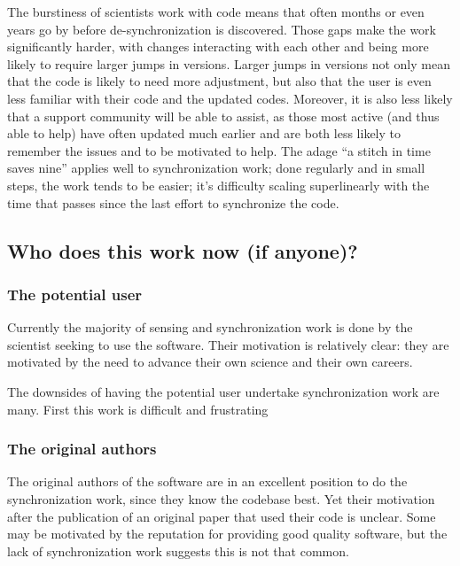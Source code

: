 \documentclass{sigchi}
\begin{document}
The burstiness of scientists work with code means that often months or even years go by before de-synchronization is discovered. Those gaps make the work significantly harder, with changes interacting with each other and being more likely to require larger jumps in versions. Larger jumps in versions not only mean that the code is likely to need more adjustment, but also that the user is even less familiar with their code and the updated codes. Moreover, it is also less likely that a support community will be able to assist, as those most active (and thus able to help) have often updated much earlier and are both less likely to remember the issues and to be motivated to help. The adage ``a stitch in time saves nine'' applies well to synchronization work; done regularly and in small steps, the work tends to be easier; it's difficulty scaling superlinearly with the time that passes since the last effort to synchronize the code.

\subsection{Who does this work now (if anyone)?}



\subsubsection{The potential user}

Currently the majority of sensing and synchronization work is done by the scientist seeking to use the software. Their motivation is relatively clear: they are motivated by the need to advance their own science and their own careers.

The downsides of having the potential user undertake synchronization work are many.  First this work is difficult and frustrating

\subsubsection{The original authors}

The original authors of the software are in an excellent position to do the synchronization work, since they know the codebase best.  Yet their motivation after the publication of an original paper that used their code is unclear.  Some may be motivated by the reputation for providing good quality software, but the lack of synchronization work suggests this is not that common. 
\end{document}
